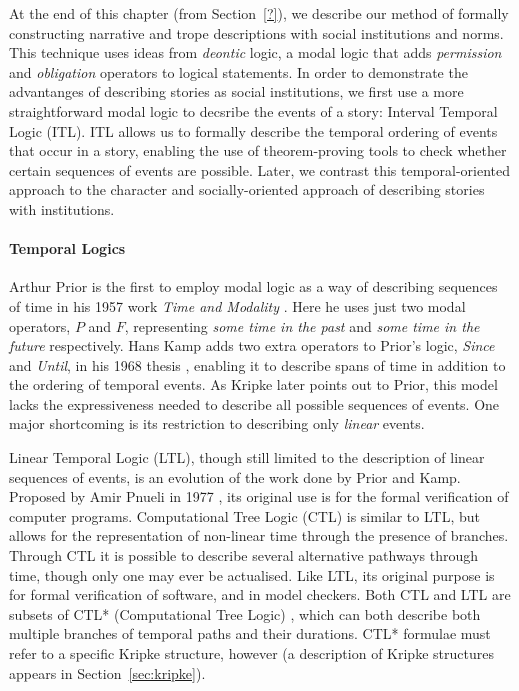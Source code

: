 \documentclass[11pt]{report}
\begin{document}
At the end of this chapter (from Section~\ref{?}), we describe our method of
formally constructing narrative and trope descriptions with social institutions
and norms. This technique uses ideas from \emph{deontic} logic, a modal logic
that adds \emph{permission} and \emph{obligation} operators to logical
statements. In order to demonstrate the advantanges of describing stories as
social institutions, we first use a more straightforward modal logic to decsribe
the events of a story: Interval Temporal Logic (ITL). ITL allows us to formally
describe the temporal ordering of events that occur in a story, enabling the use
of theorem-proving tools to check whether certain sequences of events are
possible. Later, we contrast this temporal-oriented approach to the character
and socially-oriented approach of describing stories with institutions.

\paragraph{Temporal Logics}
Arthur Prior is the first to employ modal logic as a way of describing sequences of time in his 1957 work \emph{Time and Modality} \citep{prior2003time}. Here he uses just two modal operators, $P$ and $F$, representing \emph{some time in the past} and \emph{some time in the future} respectively.
Hans Kamp adds two extra operators to Prior's logic, \emph{Since} and \emph{Until}, in his 1968 thesis \citep{kamp1968tense}, enabling it to describe spans of time in addition to the ordering of temporal events.
As Kripke later points out to Prior, this model lacks the expressiveness needed to describe all possible sequences of events. One major shortcoming is its restriction to describing only \emph{linear} events. 

Linear Temporal Logic (LTL), though still limited to the description of linear sequences of events, is an evolution of the work done by Prior and Kamp. Proposed by Amir Pnueli in 1977 \citep{pnueli1977temporal}, its original use is for the formal verification of computer programs.
Computational Tree Logic (CTL) \citep{ben1983temporal} is similar to LTL, but allows for the representation of non-linear time through the presence of branches. Through CTL it is possible to describe several alternative pathways through time, though only one may ever be actualised. Like LTL, its original purpose is for formal verification of software, and in model checkers.
Both CTL and LTL are subsets of CTL* (Computational Tree Logic) \citep{emerson1986sometimes}, which can both describe both multiple branches of temporal paths and their durations. CTL* formulae must refer to a specific Kripke structure, however (a description of Kripke structures appears in Section~\ref{sec:kripke}).
\end{document}
